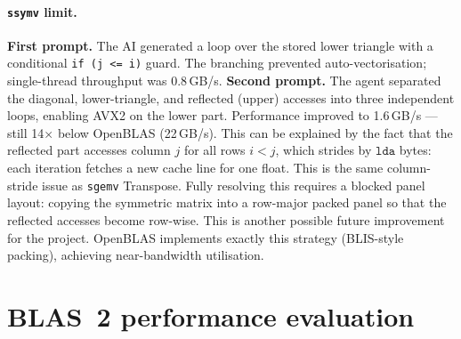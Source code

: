 \documentclass[11pt,a4paper]{article}
\begin{document}
\paragraph{\texttt{ssymv} limit.}
\textbf{First prompt.} The AI generated a loop over the stored lower triangle with a conditional
\texttt{if (j <= i)} guard. The branching prevented auto-vectorisation; single-thread throughput
was 0.8\,GB/s.
\textbf{Second prompt.} The agent separated the diagonal, lower-triangle, and reflected (upper) accesses
into three independent loops, enabling AVX2 on the lower part. Performance improved to
1.6\,GB/s — still 14$\times$ below OpenBLAS (22\,GB/s). This can be explained by the fact that the reflected part accesses
column $j$ for all rows $i < j$, which strides by $\texttt{lda}$ bytes: each iteration fetches a new cache line for one float. This is the same column-stride issue as \texttt{sgemv} Transpose.
Fully resolving this requires a blocked panel layout: copying the symmetric matrix into a
row-major packed panel so that the reflected accesses become row-wise. This is another possible future improvement for the project.
OpenBLAS implements exactly this strategy (BLIS-style packing), achieving near-bandwidth
utilisation.

\section{BLAS~2 performance evaluation}
\end{document}
